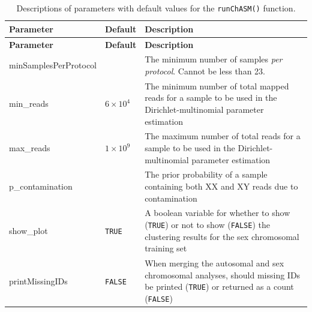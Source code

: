 \documentclass[
  letterpaper,
  DIV=11,
  numbers=noendperiod]{scrartcl}
\begin{document}
\begin{longtable}[]{@{}
  >{\raggedright\arraybackslash}p{}
  >{\raggedright\arraybackslash}p{}
  >{\raggedright\arraybackslash}p{}@{}}
\caption{Descriptions of parameters with default values for the
\protect\texttt{runChASM()}
function.\label{tab:runChASM}}\tabularnewline
\toprule\noalign{}
\begin{minipage}[b]{\linewidth}\raggedright
\textbf{Parameter}
\end{minipage} & \begin{minipage}[b]{\linewidth}\raggedright
\textbf{Default}
\end{minipage} & \begin{minipage}[b]{\linewidth}\raggedright
\textbf{Description}
\end{minipage} \\
\midrule\noalign{}
\endfirsthead
\toprule\noalign{}
\begin{minipage}[b]{\linewidth}\raggedright
\textbf{Parameter}
\end{minipage} & \begin{minipage}[b]{\linewidth}\raggedright
\textbf{Default}
\end{minipage} & \begin{minipage}[b]{\linewidth}\raggedright
\textbf{Description}
\end{minipage} \\
\midrule\noalign{}
\endhead
\bottomrule\noalign{}
\endlastfoot
minSamplesPerProtocol & 30 & The minimum number of samples \emph{per
protocol}. Cannot be less than 23. \\
min\_reads & \(6\times 10^{4}\) & The minimum number of total mapped
reads for a sample to be used in the Dirichlet-multinomial parameter
estimation \\
max\_reads & \(1\times 10^{9}\) & The maximum number of total reads for
a sample to be used in the Dirichlet-multinomial parameter estimation \\
p\_contamination & 0.01 & The prior probability of a sample containing
both XX and XY reads due to contamination \\
show\_plot & \texttt{TRUE} & A boolean variable for whether to show
(\texttt{TRUE}) or not to show (\texttt{FALSE}) the clustering results
for the sex chromosomal training set \\
printMissingIDs & \texttt{FALSE} & When merging the autosomal and sex
chromosomal analyses, should missing IDs be printed (\texttt{TRUE}) or
returned as a count (\texttt{FALSE}) \\
\end{longtable}
\end{document}
